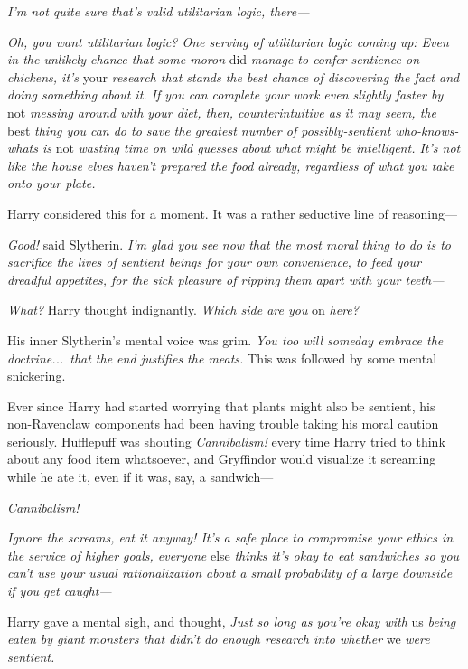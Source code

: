 \emph{I’m not quite sure that’s valid utilitarian logic, there—}

\emph{Oh, you want utilitarian logic? One serving of utilitarian logic coming up: Even in the unlikely chance that some moron} did\emph{ manage to confer sentience on chickens, it’s} your\emph{ research that stands the best chance of discovering the fact and doing something about it. If you can complete your work even slightly faster by} not\emph{ messing around with your diet, then, counterintuitive as it may seem, the} best\emph{ thing you can do to save the greatest number of possibly-sentient who-knows-whats is} not\emph{ wasting time on wild guesses about what might be intelligent. It’s not like the house elves haven’t prepared the food already, regardless of what you take onto your plate.}

Harry considered this for a moment. It was a rather seductive line of reasoning—

\emph{Good!} said Slytherin. \emph{I’m glad you see now that the most moral thing to do is to sacrifice the lives of sentient beings for your own convenience, to feed your dreadful appetites, for the sick pleasure of ripping them apart with your teeth—}

\emph{What?} Harry thought indignantly. \emph{Which side are you} on\emph{ here?}

His inner Slytherin’s mental voice was grim. \emph{You too will someday embrace the doctrine...\ that the end justifies the meats.} This was followed by some mental snickering.

Ever since Harry had started worrying that plants might also be sentient, his non-Ravenclaw components had been having trouble taking his moral caution seriously. Hufflepuff was shouting \emph{Cannibalism!} every time Harry tried to think about any food item whatsoever, and Gryffindor would visualize it screaming while he ate it, even if it was, say, a sandwich—

\emph{Cannibalism!}


\emph{Ignore the screams, eat it anyway! It’s a safe place to compromise your ethics in the service of higher goals, everyone} else\emph{ thinks it’s okay to eat sandwiches so you can’t use your usual rationalization about a small probability of a large downside if you get caught—}

Harry gave a mental sigh, and thought, \emph{Just so long as you’re okay with} us\emph{ being eaten by giant monsters that didn’t do enough research into whether} we\emph{ were sentient.}


